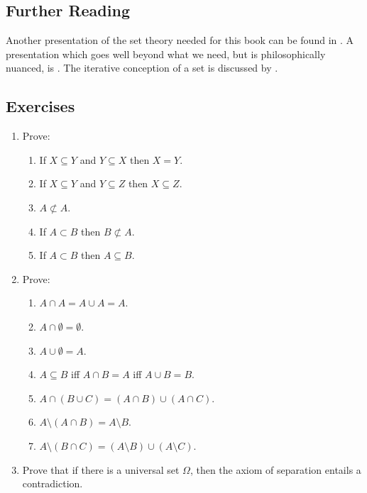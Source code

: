 {\small
\subsection*{Further Reading}


Another presentation of the set theory needed for this book can be found in
 \citet{bevpospa}. A presentation which goes well beyond what we need, but is philosophically nuanced, is
 \citet{potsetthi}. The iterative conception of a set is discussed by \citet{boolos}.



\subsection*{Exercises}

\begin{enumerate}

\item Prove: \begin{enumerate}
	\item If $X \subseteq Y$ and $Y \subseteq X$ then $X=Y$.
	\item If $X \subseteq Y$ and $Y \subseteq Z$ then $X \subseteq Z$.
	\item $A \not\subset A$.
	\item If $A \subset B$ then $B \not\subset A$.
	\item If $A \subset B$ then $A \subseteq B$.
\end{enumerate}

\item Prove: \begin{enumerate}
	\item $A\cap A=A\cup A=A$.
	\item $A \cap \emptyset = \emptyset$.
	\item $A \cup \emptyset = A$.
	\item $A \subseteq B$ iff $A \cap B = A$ iff $A \cup B = B$.
	\item $A \cap (B \cup C) = (A \cap B) \cup (A \cap C)$.
	\item $A\setminus (A \cap B) = A\setminus B$.
	\item $A \setminus (B \cap C) = (A\setminus B)\cup(A\setminus C)$.
\end{enumerate}

\item Prove that if there is a universal set $\Omega$, then the axiom of separation entails a contradiction.


\end{enumerate}}
